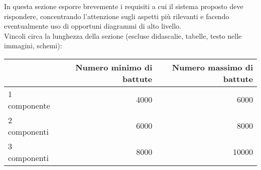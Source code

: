 In questa sezione esporre brevemente i requisiti a cui il sistema proposto deve rispondere, concentrando l'attenzione sugli aspetti più rilevanti e facendo eventualmente uso di opportuni diagrammi di alto livello.\\

Vincoli circa la lunghezza della sezione (escluse didascalie, tabelle, testo nelle immagini, schemi):

\vspace{1cm}
\begin{tabular}{l|rr}
 & Numero minimo di battute & Numero massimo di battute \\
 \hline
 1 componente & 4000 & 6000 \\
 2 componenti & 6000 & 8000 \\
 3 componenti & 8000 & 10000 \\
 \hline
\end{tabular}


\newpage
